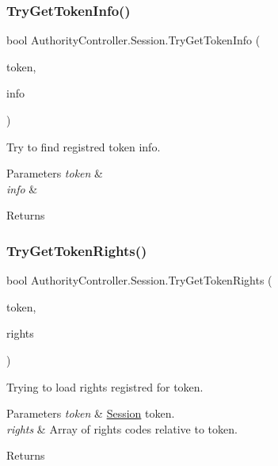 \subsubsection{\texorpdfstring{Try\+Get\+Token\+Info()}{TryGetTokenInfo()}}
{\footnotesize\ttfamily bool Authority\+Controller.\+Session.\+Try\+Get\+Token\+Info (\begin{DoxyParamCaption}\item[{string}]{token,  }\item[{out \mbox{\hyperlink{class_authority_controller_1_1_data_1_1_token_info}{Token\+Info}}}]{info }\end{DoxyParamCaption})}



Try to find registred token info. 


\begin{DoxyParams}{Parameters}
{\em token} & \\
\hline
{\em info} & \\
\hline
\end{DoxyParams}
\begin{DoxyReturn}{Returns}

\end{DoxyReturn}
\mbox{\label{class_authority_controller_1_1_session_a37157e74e3aee082b7adfb906ec69511}} 
\subsubsection{\texorpdfstring{Try\+Get\+Token\+Rights()}{TryGetTokenRights()}}
{\footnotesize\ttfamily bool Authority\+Controller.\+Session.\+Try\+Get\+Token\+Rights (\begin{DoxyParamCaption}\item[{string}]{token,  }\item[{out string \mbox{[}$\,$\mbox{]}}]{rights }\end{DoxyParamCaption})}



Trying to load rights registred for token. 


\begin{DoxyParams}{Parameters}
{\em token} & \mbox{\hyperlink{class_authority_controller_1_1_session}{Session}} token.\\
\hline
{\em rights} & Array of rights\textquotesingle{} codes relative to token.\\
\hline
\end{DoxyParams}
\begin{DoxyReturn}{Returns}

\end{DoxyReturn}


